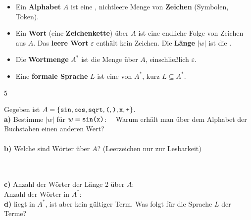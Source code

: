 \documentclass[11pt,a4paper]{article}
\newcommand{\abschnitt}[1]{\par\vspace{0.3mm}{\bfseries #1}\par\vspace{-0.8mm}}
\begin{document}
\abschnitt{4. Die Begriffe der Informatik}
\begin{merke}
\begin{itemize}
\item Ein \textbf{Alphabet} $A$ ist eine , nichtleere Menge von \textbf{Zeichen} (Symbolen, Token).
\item Ein \textbf{Wort} (eine \textbf{Zeichenkette}) über $A$ ist eine endliche Folge von Zeichen aus $A$. Das \textbf{leere Wort} $\varepsilon$ enthält kein Zeichen. Die \textbf{Länge} $|w|$ ist die .
\item Die \textbf{Wortmenge} $A^*$ ist die Menge  über $A$, einschließlich $\varepsilon$.
\item Eine \textbf{formale Sprache} $L$ ist eine   von $A^*$, kurz $L \subseteq A^*$.
\end{itemize}
\end{merke}

\begin{aufgabe}{5}
\begin{minipage}[t]{0.7\linewidth}
Gegeben ist $A = \{\texttt{sin}, \texttt{cos}, \texttt{sqrt}, \texttt{(}, \texttt{)}, \texttt{x}, \texttt{+}\}$.\\[0.5mm]
\textbf{a)} Bestimme $|w|$ für $w = \texttt{sin(x)}$: \ \ Warum erhält man über dem Alphabet der Buchstaben einen anderen Wert?\\[0.6mm]
\\[0.5mm]
\textbf{b)} Welche sind Wörter über $A$? {\small(Leerzeichen nur zur Lesbarkeit)}\\[0.5mm]
 \ \  \ \  \ \  
\end{minipage}\hfill
\begin{minipage}[t]{0.28\linewidth}\vspace{-3.5mm}\centering
{}
\end{minipage}\\[0.5mm]
\textbf{c)} Anzahl der Wörter der Länge 2 über $A$: \\[0.5mm]\hspace*{4.2mm}Anzahl der Wörter in $A^*$: \\[0.5mm]
\textbf{d)}  liegt in $A^*$, ist aber kein gültiger Term. Was folgt für die Sprache $L$ der Terme?\\[0.6mm]
\end{aufgabe}
\end{document}
